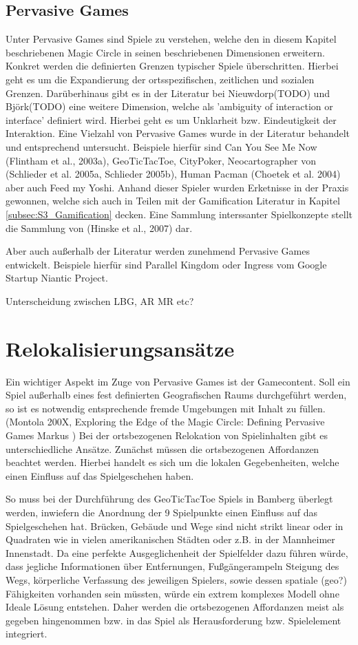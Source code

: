 \subsection*{Pervasive Games}

Unter Pervasive Games sind Spiele zu verstehen, welche den in diesem Kapitel beschriebenen Magic Circle in seinen beschriebenen Dimensionen erweitern.
Konkret werden die definierten Grenzen typischer Spiele überschritten. \cite{Montola.2005}
Hierbei geht es um die Expandierung der ortsspezifischen, zeitlichen und sozialen Grenzen. \cite{Montola.2009}
Darüberhinaus gibt es in der Literatur bei Nieuwdorp(TODO) und Björk(TODO) eine weitere Dimension, welche als 'ambiguity 
of  interaction or  interface' definiert wird. Hierbei geht es um Unklarheit bzw. Eindeutigkeit der Interaktion.
Eine Vielzahl von Pervasive Games wurde in der Literatur behandelt und entsprechend untersucht.
Beispiele hierfür sind Can You See Me Now (Flintham et al., 2003a), GeoTicTacToe, CityPoker, Neocartographer von (Schlieder et al. 2005a, Schlieder 2005b), Human Pacman (Choetek et al. 2004) aber auch Feed my Yoshi.
Anhand dieser Spieler wurden Erketnisse in der Praxis gewonnen, welche sich auch in Teilen mit der Gamification Literatur in Kapitel \ref{subsec:S3_Gamification} decken.
Eine Sammlung interssanter Spielkonzepte stellt die Sammlung von (Hinske et al., 2007) dar.

Aber auch außerhalb der Literatur werden zunehmend Pervasive Games entwickelt.
Beispiele hierfür sind Parallel Kingdom oder Ingress vom Google Startup Niantic Project.

Unterscheidung zwischen LBG, AR MR etc?

\section{Relokalisierungsansätze}

Ein wichtiger Aspekt im Zuge von Pervasive Games ist der Gamecontent. Soll ein Spiel außerhalb eines fest definierten Geografischen Raums durchgeführt werden, so ist es notwendig entsprechende fremde Umgebungen mit Inhalt zu füllen. (Montola  200X, Exploring the Edge of the Magic Circle: Defining Pervasive Games Markus )
Bei der ortsbezogenen Relokation von Spielinhalten gibt es unterschiedliche Ansätze.
Zunächst müssen die ortsbezogenen Affordanzen beachtet werden. Hierbei handelt es sich um die lokalen Gegebenheiten, welche einen Einfluss auf das Spielgeschehen haben.

So muss bei der Durchführung des GeoTicTacToe Spiels in Bamberg überlegt werden, inwiefern die Anordnung der 9 Spielpunkte einen Einfluss auf das Spielgeschehen hat. Brücken, Gebäude und Wege sind nicht strikt linear oder in Quadraten wie in vielen amerikanischen Städten oder z.B. in der Mannheimer Innenstadt. Da eine perfekte Ausgeglichenheit der Spielfelder dazu führen würde, dass jegliche Informationen über Entfernungen, Fußgängerampeln Steigung des Wegs, körperliche Verfassung des jeweiligen Spielers, sowie dessen spatiale (geo?) Fähigkeiten vorhanden sein müssten, würde ein extrem komplexes Modell ohne Ideale Lösung entstehen. Daher werden die ortsbezogenen Affordanzen meist als gegeben hingenommen bzw. in das Spiel als Herausforderung bzw. Spielelement integriert.

